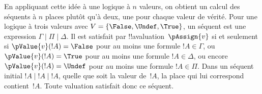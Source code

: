\documentclass[../../../include/open-logic-section]{subfiles}
\begin{document}
En appliquant cette idée à une logique à $n$ valeurs, on obtient un
calcul des séquents à $n$ places plutôt qu'à deux, une pour chaque
valeur de vérité. Pour une logique à trois valeurs avec
$V=\{\False,\Undef,\True\}$, un séquent est une expression
$\Gamma\mid\Pi\mid\Delta$. Il est satisfait par
!!a{valuation}~$\pAssign{v}$ si et seulement si
$\pValue{v}(!A)=\False$ pour au moins une formule $!A\in\Gamma$,
ou $\pValue{v}(!A)=\True$ pour au moins une formule $!A\in\Delta$,
ou encore $\pValue{v}(!A)=\Undef$ pour au moins une formule
$!A\in\Pi$. Dans un séquent initial $!A\mid !A\mid !A$, quelle que
soit la valeur de~$!A$, la place qui lui correspond contient~$!A$.
Toute valuation satisfait donc ce séquent.
\end{document}
